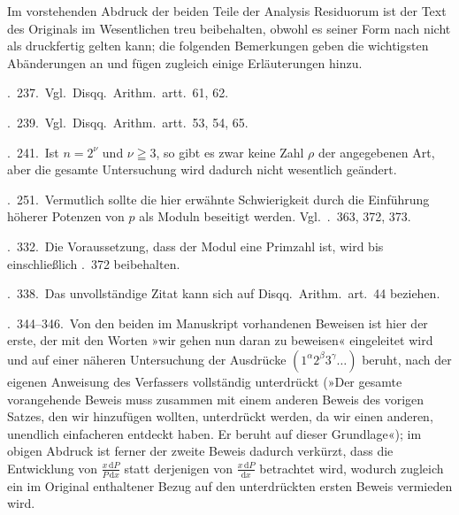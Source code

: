Im vorstehenden Abdruck der beiden Teile der Analysis Residuorum ist der Text des Originals im Wesentlichen treu beibehalten, obwohl es seiner Form nach nicht als druckfertig gelten kann; die folgenden Bemerkungen geben die wichtigsten Abänderungen an und fügen zugleich einige Erläuterungen hinzu.

\textsection.\ 237.\ Vgl.\ Disqq.\ Arithm.\ artt.\ 61, 62.

\textsection.\ 239.\ Vgl.\ Disqq.\ Arithm.\ artt.\ 53, 54, 65.

\textsection.\ 241.\ Ist $n=2^\nu$ und $\nu\geqq3$, so gibt es zwar keine Zahl $\rho$ der angegebenen Art, aber die gesamte Untersuchung wird dadurch nicht wesentlich geändert.

\textsection.\ 251.\ Vermutlich sollte die hier erwähnte Schwierigkeit durch die Einführung höherer Potenzen von $p$ als Moduln beseitigt werden. Vgl.\ \textsection\textsection.\ 363, 372, 373.

\textsection.\ 332.\ Die Voraussetzung, dass der Modul eine Primzahl ist, wird bis einschließlich \textsection.\ 372 beibehalten.

\textsection.\ 338.\ Das unvollständige Zitat kann sich auf Disqq.\ Arithm.\ art.\ 44 beziehen.

\textsection\textsection.\ 344--346.\ Von den beiden im Manuskript vorhandenen Beweisen ist hier der erste, der mit den Worten »wir gehen nun daran zu beweisen« eingeleitet wird und auf einer näheren Untersuchung der Ausdrücke $(1^\alpha2^\beta3^\gamma\ldots)$ beruht, nach der eigenen Anweisung des Verfassers vollständig unterdrückt (»Der gesamte vorangehende Beweis muss zusammen mit einem anderen Beweis des vorigen Satzes, den wir hinzufügen wollten, unterdrückt werden, da wir einen anderen, unendlich einfacheren entdeckt haben. Er beruht auf dieser Grundlage«); im obigen Abdruck ist ferner der zweite Beweis dadurch verkürzt, dass die Entwicklung von $\frac{x\,\mathrm{d}P}{P\,\mathrm{d}x}$ statt derjenigen von $\frac{x\,\mathrm{d}P}{\mathrm{d}x}$ betrachtet wird, wodurch zugleich ein im Original enthaltener Bezug auf den unterdrückten ersten Beweis vermieden wird.

